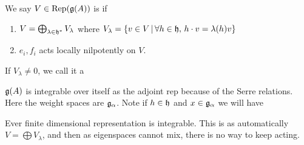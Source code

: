 \documentclass{article}
\begin{document}
\begin{definition}
We say $V \in \operatorname{Rep}(\mathfrak{g}(A))$ is  if 
\begin{enumerate}
    \item $V = \bigoplus_{\lambda \in \mathfrak{h}^\ast} V_\lambda$ where $V_\lambda = \left\{ v \in V \, | \, \forall h \in \mathfrak{h}, \, h \cdot v = \lambda(h)v \right\}$
    \item $e_i,f_i$ acts locally nilpotently on $V$. 
\end{enumerate}
\end{definition}

\begin{definition}
If $V_\lambda \neq 0$, we call it a  
\end{definition}

\begin{example}
$\mathfrak{g}(A)$ is integrable over itself as the adjoint rep because of the Serre relations. Here the weight spaces are $\mathfrak{g}_\alpha$. Note if $h \in \mathfrak{h}$ and $x \in \mathfrak{g}_\alpha$ we will have 

\end{example}

\begin{example}
Ever finite dimensional representation is integrable. This is as automatically $V = \bigoplus V_\lambda$, and then as eigenspaces cannot mix, there is no way to keep acting. 
\end{example}
\end{document}
